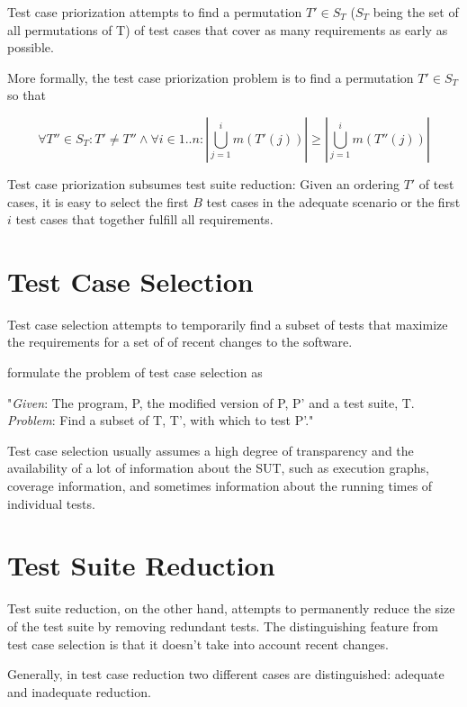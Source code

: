 Test case priorization attempts to find a permutation $T' \in S_{T}$
($S_{T}$ being the set of all permutations of T) of test cases that
cover as many requirements as early as possible.

More formally, the test case priorization problem is to find a permutation
$T' \in S_{T}$ so that

$$ \forall T'' \in S_{T}: T' \neq T'' \land \forall i \in 1..n: |\bigcup_{j=1}^{i} m(T'(j))| \geq |\bigcup_{j=1}^{i} m(T''(j))| $$


Test case priorization subsumes test suite reduction: Given an ordering
$T'$ of test cases, it is easy to select the first $B$ test cases in
the adequate scenario or the first $i$ test cases that together fulfill
all requirements.

\section{Test Case Selection}

Test case selection attempts to temporarily find a subset of tests that
maximize the requirements for a set of of recent changes to the software.

\cite{yoo2012regression} formulate the problem of test case selection as

"\textit{Given}: The program, P, the modified version of P, P' and a test suite, T. \\
\textit{Problem}: Find a subset of T, T', with which to test P'."

Test case selection usually assumes a high degree of transparency and
the availability of a lot of information about the SUT, such as execution
graphs, coverage information, and sometimes information about the running
times of individual tests.

\section{Test Suite Reduction}

Test suite reduction, on the other hand, attempts to permanently reduce
the size of the test suite by removing redundant tests. The distinguishing
feature from test case selection is that it doesn't take into account
recent changes.


Generally, in test case reduction two different cases are distinguished:
adequate and inadequate reduction.

